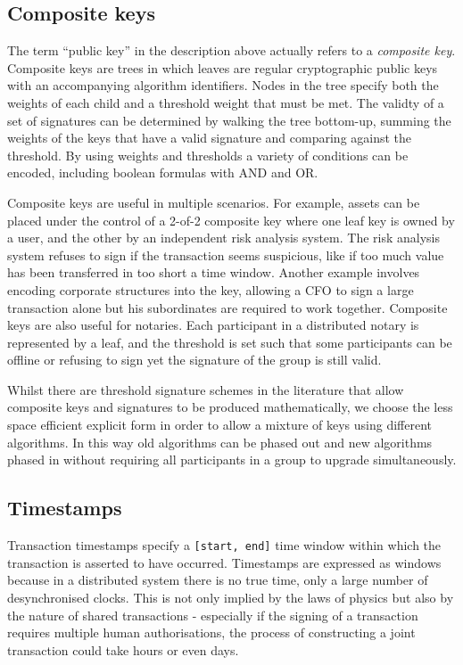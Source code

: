 \documentclass{article}
\begin{document}
\subsection{Composite keys}\label{sec:composite-keys}

The term ``public key'' in the description above actually refers to a \emph{composite key}. Composite keys are trees in
which leaves are regular cryptographic public keys with an accompanying algorithm identifiers. Nodes in the tree specify
both the weights of each child and a threshold weight that must be met. The validty of a set of signatures can be
determined by walking the tree bottom-up, summing the weights of the keys that have a valid signature and comparing
against the threshold. By using weights and thresholds a variety of conditions can be encoded, including boolean
formulas with AND and OR.

Composite keys are useful in multiple scenarios. For example, assets can be placed under the control of a 2-of-2
composite key where one leaf key is owned by a user, and the other by an independent risk analysis system. The
risk analysis system refuses to sign if the transaction seems suspicious, like if too much value has been
transferred in too short a time window. Another example involves encoding corporate structures into the key,
allowing a CFO to sign a large transaction alone but his subordinates are required to work together. Composite keys
are also useful for notaries. Each participant in a distributed notary is represented by a leaf, and the threshold
is set such that some participants can be offline or refusing to sign yet the signature of the group is still valid.

Whilst there are threshold signature schemes in the literature that allow composite keys and signatures to be produced
mathematically, we choose the less space efficient explicit form in order to allow a mixture of keys using different
algorithms. In this way old algorithms can be phased out and new algorithms phased in without requiring all
participants in a group to upgrade simultaneously.

\subsection{Timestamps}\label{sec:timestamps}

Transaction timestamps specify a \texttt{[start, end]} time window within which the transaction is asserted to have
occurred. Timestamps are expressed as windows because in a distributed system there is no true time, only a large number
of desynchronised clocks. This is not only implied by the laws of physics but also by the nature of shared transactions
- especially if the signing of a transaction requires multiple human authorisations, the process of constructing
a joint transaction could take hours or even days.
\end{document}
